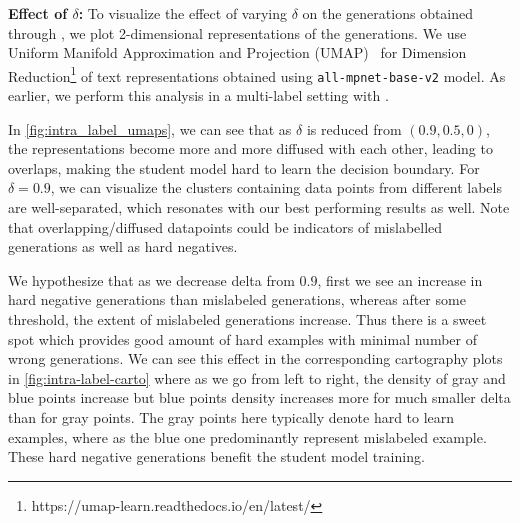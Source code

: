 \textbf{Effect of $\delta$:} To visualize the effect of varying $\delta$ on the generations obtained through \corrsyn, we plot 2-dimensional representations of the generations. We use Uniform Manifold Approximation and Projection (UMAP)~\cite{mcinnes2020umap} for Dimension Reduction\footnote{https://umap-learn.readthedocs.io/en/latest/} of text representations obtained using \texttt{all-mpnet-base-v2} model. As earlier, we perform this analysis in a multi-label setting with \ToIHeadlines. 

In \autoref{fig:intra_label_umaps}, we can see that as $\delta$ is reduced from $(0.9, 0.5, 0)$, the representations become more and more diffused with each other, leading to overlaps, making the student model hard to learn the decision boundary. For $\delta=0.9$, we can visualize the clusters containing data points from different labels are well-separated, which resonates with our best performing results as well. Note that overlapping/diffused datapoints could be indicators of mislabelled generations as well as hard negatives. 

We hypothesize that as we decrease delta from $0.9$, first we see an increase in hard negative generations than mislabeled generations, whereas after some threshold, the extent of mislabeled generations increase. Thus there is a sweet spot which provides good amount of hard examples with minimal number of wrong generations. We can see this effect in the corresponding cartography plots \cite{swayamdipta-etal-2020-dataset} in \autoref{fig:intra-label-carto} where as we go from left to right, the density of gray and blue points increase but blue points density increases more for much smaller delta than for gray points. The gray points here typically denote hard to learn examples, where as the blue one predominantly represent mislabeled example. These hard negative generations benefit the student model training. %